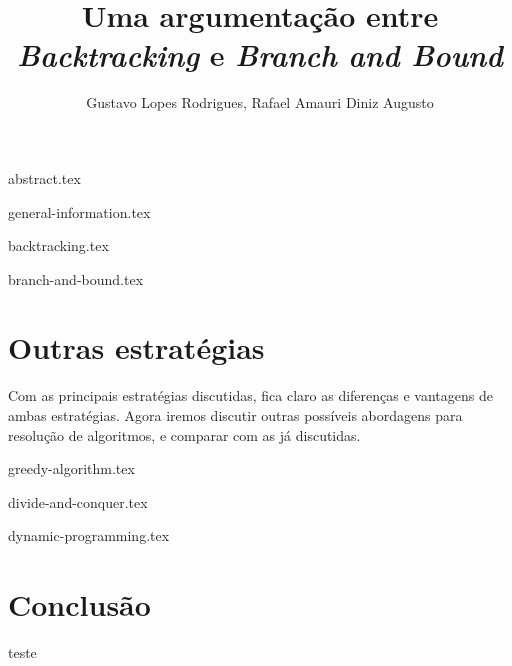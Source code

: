 \documentclass[12pt]{article}
\title{Uma argumentação entre \emph{Backtracking} e \emph{Branch and Bound}}
\author{Gustavo Lopes Rodrigues\inst{1}, Rafael Amauri Diniz Augusto\inst{2}}
\begin{document}
 

  \maketitle

  {abstract.tex}

  {general-information.tex}

  {backtracking.tex}

  {branch-and-bound.tex}

  \section{Outras estratégias} \label{sec:other-strategies}

    Com as principais estratégias discutidas, fica claro as diferenças 
    e vantagens de ambas estratégias. Agora iremos discutir outras possíveis
    abordagens para resolução de algoritmos, e comparar com as já discutidas.
    
    {greedy-algorithm.tex}

    {divide-and-conquer.tex}
  
    {dynamic-programming.tex}

  \section{Conclusão}

  teste 

  
  
\end{document}
